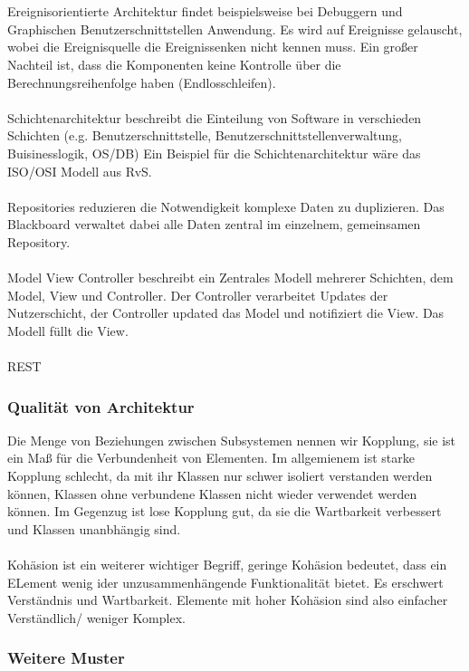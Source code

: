 \\ \\
Ereignisorientierte Architektur findet beispielsweise bei Debuggern und Graphischen Benutzerschnittstellen Anwendung.
Es wird auf Ereignisse gelauscht, wobei die Ereignisquelle die Ereignissenken nicht kennen muss.
Ein großer Nachteil ist, dass die Komponenten keine Kontrolle über die Berechnungsreihenfolge haben (Endlosschleifen).
\\ \\
Schichtenarchitektur beschreibt die Einteilung von Software in verschieden Schichten 
(e.g. Benutzerschnittstelle, Benutzerschnittstellenverwaltung, Buisinesslogik, OS/DB)
Ein Beispiel für die Schichtenarchitektur wäre das ISO/OSI Modell aus RvS.
\\ \\
Repositories reduzieren die Notwendigkeit komplexe Daten zu duplizieren.
Das Blackboard verwaltet dabei alle Daten zentral im einzelnem, gemeinsamen Repository.
\\ \\
Model View Controller beschreibt ein Zentrales Modell mehrerer Schichten, dem Model, View und Controller.
Der Controller verarbeitet Updates der Nutzerschicht, der Controller updated das Model und notifiziert die View.
Das Modell füllt die View.
\\ \\
REST

\subsubsection{Qualität von Architektur}

Die Menge von Beziehungen zwischen Subsystemen nennen wir Kopplung, sie ist ein Maß für die Verbundenheit von Elementen.
Im allgemienem ist starke Kopplung schlecht, da mit ihr Klassen nur schwer isoliert verstanden werden können, Klassen
ohne verbundene Klassen nicht wieder verwendet werden können.
Im Gegenzug ist lose Kopplung gut, da sie die Wartbarkeit verbessert und Klassen unanbhängig sind.
\\ \\
Kohäsion ist ein weiterer wichtiger Begriff, geringe Kohäsion bedeutet, dass ein ELement wenig ider unzusammenhängende 
Funktionalität bietet.
Es erschwert Verständnis und Wartbarkeit.
Elemente mit hoher Kohäsion sind also einfacher Verständlich/ weniger Komplex.

\subsubsection{Weitere Muster}

